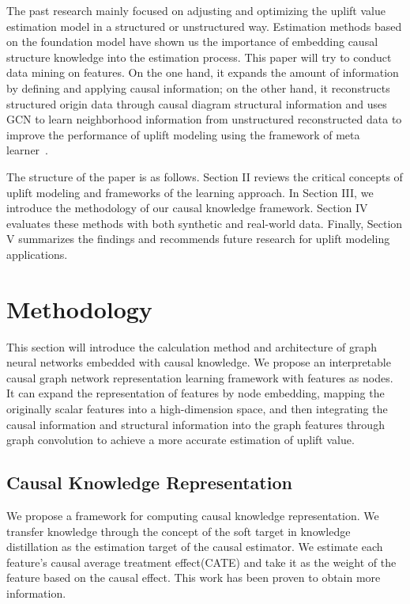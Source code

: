 \documentclass[sigconf,screen]{acmart}
\begin{document}
The past research mainly focused on adjusting and optimizing the uplift value estimation model in a structured or unstructured way. Estimation methods based on the foundation model have shown us the importance of embedding causal structure knowledge into the estimation process. This paper will try to conduct data mining on features. On the one hand, it expands the amount of information by defining and applying causal information; on the other hand, it reconstructs structured origin data through causal diagram structural information and uses GCN to learn neighborhood information from unstructured reconstructed data to improve the performance of uplift modeling using the framework of meta learner~\citep{meta:Ton}.

The structure of the paper is as follows. Section II reviews the critical concepts of uplift modeling and frameworks of the learning approach. In Section III, we introduce the methodology of our causal knowledge framework. Section IV evaluates these methods with both synthetic and real-world data. Finally, Section V summarizes the findings and recommends future research for uplift modeling applications.

\section{Methodology}

This section will introduce the calculation method and architecture of graph neural networks embedded with causal knowledge.
We propose an interpretable causal graph network representation learning framework with features as nodes. It can expand the representation of features by node embedding, mapping the originally scalar features into a high-dimension space, and then integrating the causal information and structural information into the graph features through graph convolution to achieve a more accurate estimation of uplift value.

\subsection{Causal Knowledge Representation}
We propose a framework for computing causal knowledge representation. We transfer knowledge through the concept of the soft target in knowledge distillation as the estimation target of the causal estimator. We estimate each feature's causal average treatment effect(CATE) and take it as the weight of the feature based on the causal effect. This work has been proven to obtain more information.
\end{document}
